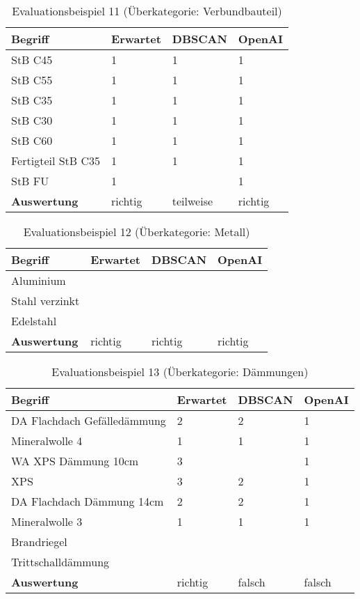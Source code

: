 \begin{table}[h]
	
	\centering
	\begin{tabular}{|l|l|l|l|}
		\hline
		\textbf{Begriff} & \textbf{Erwartet} & \textbf{DBSCAN} & \textbf{OpenAI}\\ \hline
		 StB C45 & 1 & 1 & 1 \\ \hline
		StB C55 & 1 & 1 & 1 \\ \hline
		StB C35 & 1 & 1 & 1 \\ \hline
		StB C30 & 1 & 1 & 1 \\ \hline
		StB C60 & 1 & 1 & 1 \\ \hline
		Fertigteil StB C35 & 1 & 1 & 1 \\ \hline
		StB FU & 1 & ~ & 1 \\ \hline
		\textbf{Auswertung} & richtig & teilweise & richtig \\ \hline
	\end{tabular}
	\caption{Evaluationsbeispiel 11 (Überkategorie: Verbundbauteil)}
	\label{t:evaluation-example11}
\end{table}

\begin{table}[h]
	
	\centering
	\begin{tabular}{|l|l|l|l|}
		\hline
		\textbf{Begriff} & \textbf{Erwartet} & \textbf{DBSCAN} & \textbf{OpenAI}\\ \hline
		 Aluminium & ~ & ~ & ~ \\ \hline
		Stahl verzinkt & ~ & ~ & ~ \\ \hline
		Edelstahl  & ~ & ~ & ~ \\ \hline
		\textbf{Auswertung} & richtig & richtig & richtig\\ \hline
	\end{tabular}
	\caption{Evaluationsbeispiel 12 (Überkategorie: Metall)}
	\label{t:evaluation-example12}
\end{table}

\begin{table}[h]
	
	\centering
	\begin{tabular}{|l|l|l|l|}
		\hline
		\textbf{Begriff} & \textbf{Erwartet} & \textbf{DBSCAN} & \textbf{OpenAI}\\ \hline
		  DA Flachdach Gefälledämmung & 2 & 2 & 1 \\ \hline
		Mineralwolle 4 & 1 & 1 & 1 \\ \hline
		WA XPS Dämmung 10cm & 3 & ~ & 1 \\ \hline
		XPS & 3 & 2 & 1 \\ \hline
		DA Flachdach Dämmung 14cm & 2 & 2 & 1 \\ \hline
		Mineralwolle 3 & 1 & 1 & 1 \\ \hline
		Brandriegel & ~ & ~ & ~ \\ \hline
		Trittschalldämmung  & ~ & ~ & ~ \\ \hline
		\textbf{Auswertung} & richtig & falsch & falsch \\ \hline
	\end{tabular}
	\caption{Evaluationsbeispiel 13 (Überkategorie: Dämmungen)}
	\label{t:evaluation-example13}
\end{table}

